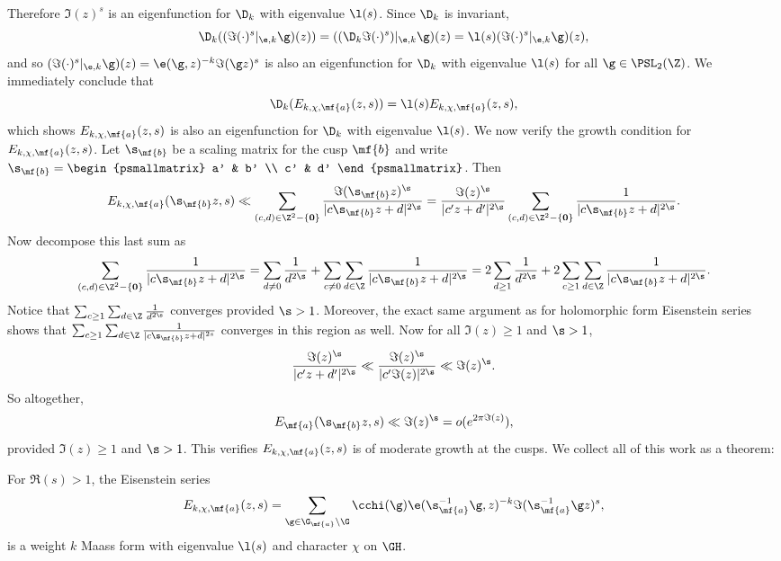     Therefore $\Im(z)^{s}$ is an eigenfunction for $\D_{k}$ with eigenvalue $\l(s)$. Since $\D_{k}$ is invariant,
    \[
      \D_{k}((\Im(\cdot)^{s}|_{\e,k}\g)(z)) = ((\D_{k}\Im(\cdot)^{s})|_{\e,k}\g)(z) = \l(s)(\Im(\cdot)^{s}|_{\e,k}\g)(z),
    \]
    and so $(\Im(\cdot)^{s}|_{\e,k}\g)(z) = \e(\g,z)^{-k}\Im(\g z)^{s}$ is also an eigenfunction for $\D_{k}$ with eigenvalue $\l(s)$ for all $\g \in \PSL_{2}(\Z)$. We immediately conclude that
    \[
      \D_{k}(E_{k,\chi,\mf{a}}(z,s)) = \l(s)E_{k,\chi,\mf{a}}(z,s),
    \]
    which shows $E_{k,\chi,\mf{a}}(z,s)$ is also an eigenfunction for $\D_{k}$ with eigenvalue $\l(s)$. We now verify the growth condition for $E_{k,\chi,\mf{a}}(z,s)$. Let $\s_{\mf{b}}$ be a scaling matrix for the cusp $\mf{b}$ and write $\s_{\mf{b}} = \begin{psmallmatrix} a' & b' \\ c' & d' \end{psmallmatrix}$. Then
    \[
      E_{k,\chi,\mf{a}}(\s_{\mf{b}}z,s) \ll \sum_{(c,d) \in \Z^{2}-\{\mathbf{0}\}}\frac{\Im(\s_{\mf{b}}z)^{\s}}{|c\s_{\mf{b}}z+d|^{2\s}} = \frac{\Im(z)^{\s}}{|c'z+d'|^{2\s}}\sum_{(c,d) \in \Z^{2}-\{\mathbf{0}\}}\frac{1}{|c\s_{\mf{b}}z+d|^{2\s}}.
    \]
    Now decompose this last sum as
    \[
      \sum_{(c,d) \in \Z^{2}-\{\mathbf{0}\}}\frac{1}{|c\s_{\mf{b}}z+d|^{2\s}} = \sum_{d \neq 0}\frac{1}{d^{2\s}}+\sum_{c \neq 0}\sum_{d \in \Z}\frac{1}{|c\s_{\mf{b}}z+d|^{2\s}} = 2\sum_{d \ge 1}\frac{1}{d^{2\s}}+2\sum_{c \ge 1}\sum_{d \in \Z}\frac{1}{|c\s_{\mf{b}}z+d|^{2\s}}.
    \]
    Notice that $\sum_{c \ge 1}\sum_{d \in \Z}\frac{1}{d^{2\s}}$ converges provided $\s > 1$. Moreover, the exact same argument as for holomorphic form Eisenstein series shows that $\sum_{c \ge 1}\sum_{d \in \Z}\frac{1}{|c\s_{\mf{b}}z+d|^{2s}}$ converges in this region as well. Now for all $\Im(z) \ge 1$ and $\s > 1$,
    \[
      \frac{\Im(z)^{\s}}{|c'z+d'|^{2\s}} \ll \frac{\Im(z)^{\s}}{|c'\Im(z)|^{2\s}} \ll \Im(z)^{\s}.
    \]
    So altogether,
    \[
      E_{\mf{a}}(\s_{\mf{b}}z,s) \ll \Im(z)^{\s} = o(e^{2\pi\Im(z)}),
    \]
    provided $\Im(z) \ge 1$ and $\s > 1$. This verifies $E_{k,\chi,\mf{a}}(z,s)$ is of moderate growth at the cusps. We collect all of this work as a theorem:

    \begin{theorem}
      For $\Re(s) > 1$, the Eisenstein series
      \[
          E_{k,\chi,\mf{a}}(z,s) = \sum_{\g \in \G_{\mf{a}}\backslash\G}\cchi(\g)\e(\s_{\mf{a}}^{-1}\g,z)^{-k}\Im(\s_{\mf{a}}^{-1}\g z)^{s},
      \]
      is a weight $k$ Maass form with eigenvalue $\l(s)$ and character $\chi$ on $\GH$.
    \end{theorem}

